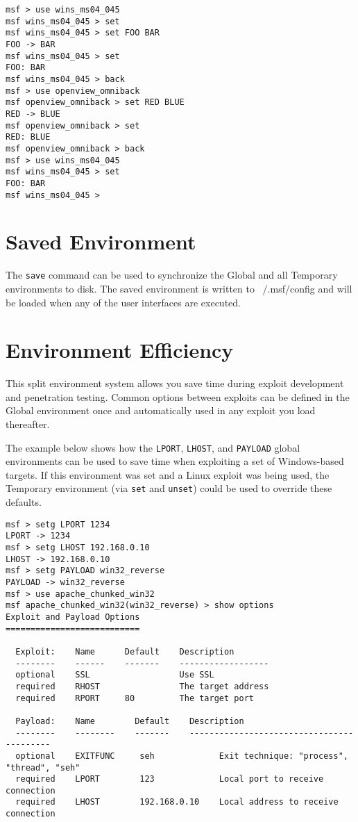 \documentclass{report}
\begin{document}
\begin{verbatim}
msf > use wins_ms04_045
msf wins_ms04_045 > set
msf wins_ms04_045 > set FOO BAR
FOO -> BAR
msf wins_ms04_045 > set
FOO: BAR
msf wins_ms04_045 > back
msf > use openview_omniback
msf openview_omniback > set RED BLUE
RED -> BLUE
msf openview_omniback > set
RED: BLUE
msf openview_omniback > back
msf > use wins_ms04_045
msf wins_ms04_045 > set
FOO: BAR
msf wins_ms04_045 >
\end{verbatim}


    \section{Saved Environment}
    \label{ENV-SAVE}
\par
The \texttt{save} command can be used to synchronize the Global and all
Temporary environments to disk. The saved environment is written to
~/.msf/config and will be loaded when any of the user interfaces are executed.  


    \section{Environment Efficiency}
    \label{ENV-EFF}
\par
This split environment system allows you save time during exploit development
and penetration testing. Common options between exploits can be defined in the
Global environment once and automatically used in any exploit you load thereafter.  

\par
The example below shows how the \texttt{LPORT}, \texttt{LHOST}, and
\texttt{PAYLOAD} global environments can be used to save time when exploiting a
set of Windows-based targets. If this environment was set and a Linux exploit
was being used, the Temporary environment (via \texttt{set} and \texttt{unset})
could be used to override these defaults.  

\begin{verbatim}
msf > setg LPORT 1234
LPORT -> 1234
msf > setg LHOST 192.168.0.10 
LHOST -> 192.168.0.10
msf > setg PAYLOAD win32_reverse
PAYLOAD -> win32_reverse
msf > use apache_chunked_win32 
msf apache_chunked_win32(win32_reverse) > show options 
Exploit and Payload Options
===========================

  Exploit:    Name      Default    Description
  --------    ------    -------    ------------------    
  optional    SSL                  Use SSL
  required    RHOST                The target address
  required    RPORT     80         The target port
  
  Payload:    Name        Default    Description
  --------    --------    -------    ------------------------------------------    
  optional    EXITFUNC     seh             Exit technique: "process", "thread", "seh"
  required    LPORT        123             Local port to receive connection
  required    LHOST        192.168.0.10    Local address to receive connection
\end{verbatim}
\end{document}
